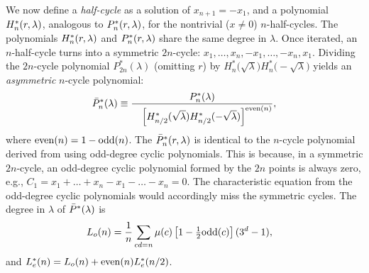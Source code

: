 \documentclass{ws-ijbc}
\begin{document}

%
%
%
%

We now define a \emph{half-cycle}
  as a solution of $x_{n+1} = -x_1$,
  and a polynomial $H^{*}_n(r, \lambda)$,
  analogous to $P^*_n(r, \lambda)$,
  for the nontrivial ($x \ne 0$) $n$-half-cycles.
%
The polynomials $H^*_n(r, \lambda)$ and $P^*_n(r, \lambda)$
  share the same degree in $\lambda$.
%
Once iterated, an $n$-half-cycle turns into a symmetric $2n$-cycle:
  $x_1, \ldots, x_{n}, -x_1, \ldots, -x_{n}, x_1$.
%
Dividing the $2n$-cycle polynomial $P^{*}_{2n}(\lambda)$
  (omitting $r$)
  by
  $H^{*}_{n}\big(\sqrt \lambda\big)
   H^{*}_{n}\big(-\sqrt \lambda\big)$
%
yields an \emph{asymmetric} $n$-cycle polynomial:
\begin{equation}
\bar P^*_n(\lambda) \equiv
  \frac{
    P^*_n(\lambda)
  }
  { \quad
    \left[
      H^*_{n/2}(\sqrt\lambda)
      H^*_{n/2}(-\sqrt\lambda)
    \right]^{\mathrm{even}(n)}
  },
\notag
\end{equation}
%
where $\mathrm{even}(n)=1-\mathrm{odd}(n)$.
%
The $\bar P^*_n(r, \lambda)$ is
  identical to the $n$-cycle polynomial
  derived from  using odd-degree cyclic polynomials.
%
This is because,
  in a symmetric $2n$-cycle,
  an odd-degree cyclic polynomial formed by the $2n$ points
  is always zero,
  e.g., $C_1 = x_1 + \dots + x_n - x_1 - \dots - x_n = 0$.
%
The characteristic equation from the odd-degree cyclic polynomials
  would accordingly miss the symmetric cycles.
%
The degree in $\lambda$ of $\bar P^*(\lambda)$ is
%
\begin{align*}
  L_o(n) &= %
      \frac{1}{n} \sum_{cd = n}
    \mu(c) \left[1 - \tfrac{1}{2}\odd(c)\right] (3^d-1),
\end{align*}
and
$L^*_e(n) = L_o(n) + \mathrm{even}(n) L^*_e(n/2)$.
\end{document}
